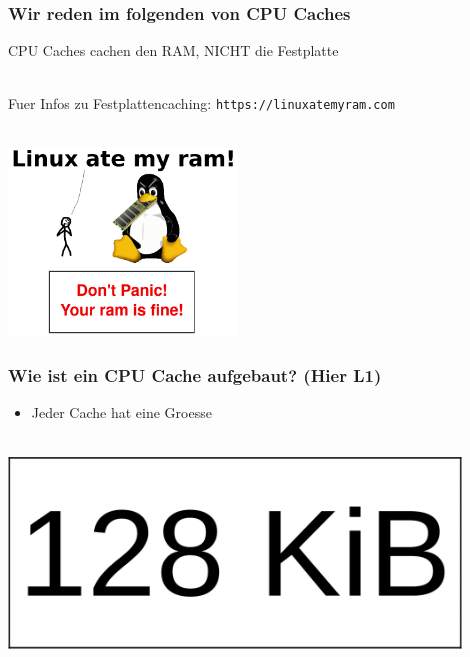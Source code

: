 \documentclass{beamer}
\begin{document}
\begin{frame}
\frametitle{Wir reden im folgenden von CPU Caches}
{
\centering
CPU Caches cachen den RAM, NICHT die Festplatte\\~\\
}

Fuer Infos zu Festplattencaching: \texttt{https://linuxatemyram.com}\\~\\
\centerline{\includegraphics[height=5cm]{linuxatemyram.png}}
\end{frame}

\begin{frame}
\frametitle{Wie ist ein CPU Cache aufgebaut? (Hier L1)}
\begin{itemize}
    \item Jeder Cache hat eine Groesse\\~\\
\end{itemize}
\centerline{\includegraphics[width=12cm]{cell1.png}}
\end{frame}
\end{document}
